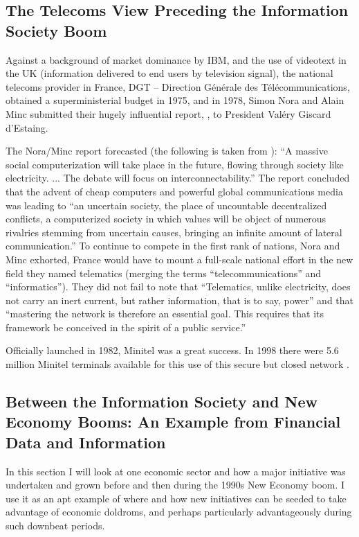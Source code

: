 \documentclass{article}
\begin{document}
\subsection{The Telecoms View Preceding the Information Society Boom} 

Against a background of market dominance by IBM, and the use of 
videotext in the 
UK (information delivered to end users by television signal), the 
national telecoms 
provider in France, DGT -- Direction G\'en\'erale 
des T\'el\'ecommunications, obtained a 
superministerial budget in 1975, and in 1978, Simon Nora and 
Alain Minc submitted 
their hugely influential report, \cite{nora},
to President Val\'ery 
Giscard d'Estaing.

The Nora/Minc report forecasted (the following is taken from
\cite{rheingold}):    ``A massive social computerization will take place in the future, 
flowing through 
society like electricity. ...  The debate will focus on 
interconnectability.''
The report concluded 
that the advent of cheap 
computers and powerful global communications media was leading to 
``an uncertain 
society, the place of uncountable decentralized conflicts, a 
computerized society in 
which values will be object of numerous rivalries stemming from 
uncertain causes, 
bringing an infinite amount of lateral communication.'' To continue 
to compete in the 
first rank of nations, Nora and Minc exhorted, France would have to 
mount a full-scale 
national effort in the new field they named telematics (merging the terms ``telecommunications'' and 
``informatics''). They did not fail to 
note that ``Telematics, 
unlike electricity, does not carry an inert current, 
but rather 
information, that is to say, power'' and that ``mastering the 
network is therefore an 
essential goal. This requires that its framework be conceived in 
the spirit of a public service.''

Officially launched in 1982, Minitel was a great success.  In 
1998 there were 5.6 million Minitel terminals available for this use of this
secure but closed network \cite{mchoes}.  


\subsection{Between the Information Society and New Economy 
Booms: An Example from Financial Data and Information}

In this section I will look at one economic sector and how 
a major initiative was
undertaken and grown before and then during the 1990s
New Economy boom.  I use it as an apt 
example of where and how new initiatives can be seeded
to take advantage of economic doldroms, and perhaps particularly 
advantageously during such downbeat periods.  
\end{document}
